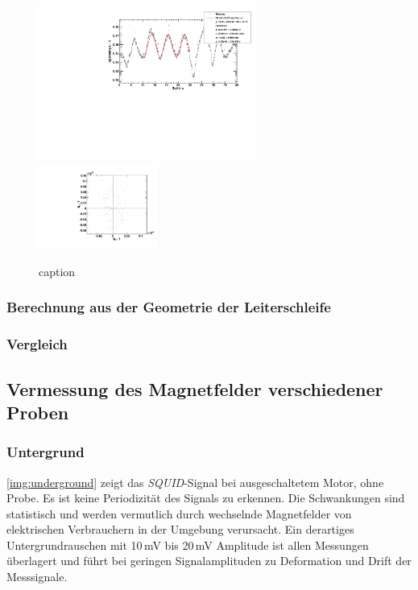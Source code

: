 \begin{figure}[H]
\begin{center}
  \includegraphics[width=0.64\textwidth]{../img/fit_Spule_R5_1.pdf}
  \includegraphics[width=0.35\textwidth]{../img/polar_Spule_R5_1.pdf}
  \caption{caption}
  \label{img:R5}
\end{center}
\end{figure}

\subsubsection{Berechnung aus der Geometrie der Leiterschleife}

\subsubsection{Vergleich}





\subsection{Vermessung des Magnetfelder verschiedener Proben}

\subsubsection{Untergrund}
\autoref{img:underground} zeigt das \emph{SQUID}-Signal bei ausgeschaltetem Motor, ohne Probe.
Es ist keine Periodizität des Signals zu erkennen. Die Schwankungen sind statistisch
und werden vermutlich durch wechselnde Magnetfelder von elektrischen Verbrauchern in der Umgebung verursacht.
Ein derartiges Untergrundrauschen mit 10\,mV bis 20\,mV Amplitude
ist allen Messungen überlagert und führt bei geringen Signalamplituden zu
Deformation und Drift der Messsignale.

